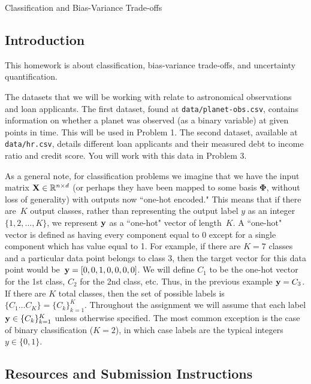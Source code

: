 \documentclass[submit]{../harvardml}
\begin{document}
\begin{center}
  {\Large Classification and Bias-Variance Trade-offs}\\
\end{center}

\subsection*{Introduction}

This homework is about classification, bias-variance trade-offs, and
uncertainty quantification.

The datasets that we will be working with relate to astronomical observations and loan applicants.
The first dataset, found at \verb|data/planet-obs.csv|,
contains information on whether a planet was observed (as a binary
variable) at given points in time. This will be used in Problem 1. The
second dataset, available at \verb|data/hr.csv|, details different
loan applicants and their measured debt to income ratio and credit score. You will
work with this data in Problem 3.

As a general note, for classification problems we imagine that we have
the input matrix $\mathbf{X} \in \mathbb{R}^{n \times d}$ (or perhaps they
have been mapped to some basis $\bm{\Phi}$, without loss of
generality) with outputs now ``one-hot encoded."  This means that if
there are~$K$ output classes, rather than representing the output
label $y$ as an integer~$\{1,2,\ldots,K\}$, we represent $\mathbf{y}$ as a
``one-hot" vector of length~$K$. A ``one-hot" vector is defined as
having every component equal to 0 except for a single component which
has value equal to 1.  For example, if there are $K = 7$ classes and a
particular data point belongs to class 3, then the target vector for
this data point would be~$\mathbf{y} = [0,0,1,0,0,0,0]$.  We will define
$C_1$ to be the one-hot vector for the 1st class, $C_2$ for the 2nd
class, etc.  Thus, in the previous example $\mathbf{y} = C_3$. If there
are $K$ total classes, then the set of possible labels is $\{C_1
  \ldots C_K \} = \{C_k\}_{k=1}^K$.  Throughout the assignment we will
assume that each label $\mathbf{y} \in \{C_k\}_{k=1}^K$ unless otherwise
specified. The most common exception is the case of binary
classification ($K = 2$), in which case labels are the typical
integers $y \in \{0, 1\}$.

\subsection*{Resources and Submission Instructions}
\end{document}
